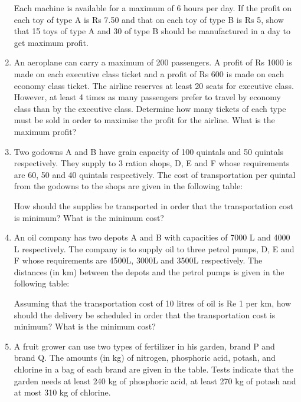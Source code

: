 \documentclass[journal,12pt,twocolumn]{IEEEtran}
\begin{document}
\begin{enumerate}
\begin{table}[h]
\centering

\caption{}
\end{table}

Each machine is available for a maximum of 6 hours per day. If the profit on each toy of type A is Rs 7.50 and that on each toy of type B is Rs 5, show that 15 toys of type A and 30 of type B should be manufactured in a day to get maximum profit.

\item An aeroplane can carry a maximum of 200 passengers. A profit of Rs 1000 is made on each executive class ticket and a profit of Rs 600 is made on each
economy class ticket. The airline reserves at least 20 seats for executive class. However, at least 4 times as many passengers prefer to travel by economy class than by the executive class. Determine how many tickets of each type must be sold in order to maximise the profit for the airline. What is the maximum profit?

\item Two godowns A and B have grain capacity of 100 quintals and 50 quintals respectively. They supply to 3 ration shops, D, E and F whose requirements are 60, 50 and 40 quintals respectively. The cost of transportation per quintal from the godowns to the shops are given in the following table:

\begin{table}[h]
\centering

\caption{}
\end{table}

How should the supplies be transported in order that the transportation cost is minimum? What is the minimum cost?

\item An oil company has two depots A and B with capacities of 7000 L and 4000 L respectively. The company is to supply oil to three petrol pumps, D, E and F whose requirements are 4500L, 3000L and 3500L respectively. The distances (in km) between the depots and the petrol pumps is given in the following table:

\begin{table}[h]
\centering

\caption{}
\end{table}

Assuming that the transportation cost of 10 litres of oil is Re 1 per km, how should the delivery be scheduled in order that the transportation cost is minimum? What is the minimum cost?

\item A fruit grower can use two types of fertilizer in his garden, brand P and brand Q. The amounts (in kg) of nitrogen, phosphoric acid, potash, and chlorine in a bag of each brand are given in the table. Tests indicate that the garden needs at least 240 kg of phosphoric acid, at least 270 kg of potash and at most 310 kg of chlorine.\label{q8} 


\end{enumerate}
\end{document}
